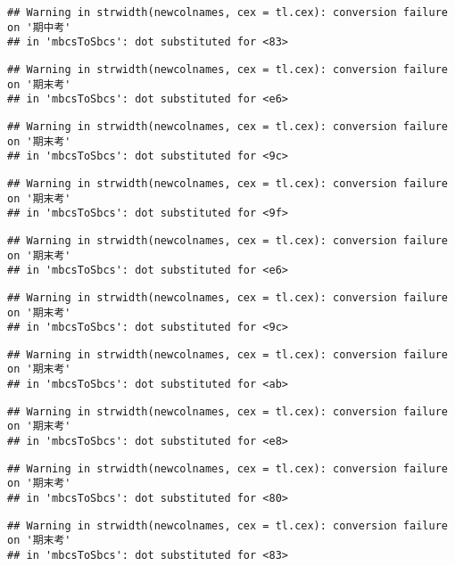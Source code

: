 \documentclass[
]{book}
\begin{document}
\begin{verbatim}
## Warning in strwidth(newcolnames, cex = tl.cex): conversion failure on '期中考'
## in 'mbcsToSbcs': dot substituted for <83>
\end{verbatim}

\begin{verbatim}
## Warning in strwidth(newcolnames, cex = tl.cex): conversion failure on '期末考'
## in 'mbcsToSbcs': dot substituted for <e6>
\end{verbatim}

\begin{verbatim}
## Warning in strwidth(newcolnames, cex = tl.cex): conversion failure on '期末考'
## in 'mbcsToSbcs': dot substituted for <9c>
\end{verbatim}

\begin{verbatim}
## Warning in strwidth(newcolnames, cex = tl.cex): conversion failure on '期末考'
## in 'mbcsToSbcs': dot substituted for <9f>
\end{verbatim}

\begin{verbatim}
## Warning in strwidth(newcolnames, cex = tl.cex): conversion failure on '期末考'
## in 'mbcsToSbcs': dot substituted for <e6>
\end{verbatim}

\begin{verbatim}
## Warning in strwidth(newcolnames, cex = tl.cex): conversion failure on '期末考'
## in 'mbcsToSbcs': dot substituted for <9c>
\end{verbatim}

\begin{verbatim}
## Warning in strwidth(newcolnames, cex = tl.cex): conversion failure on '期末考'
## in 'mbcsToSbcs': dot substituted for <ab>
\end{verbatim}

\begin{verbatim}
## Warning in strwidth(newcolnames, cex = tl.cex): conversion failure on '期末考'
## in 'mbcsToSbcs': dot substituted for <e8>
\end{verbatim}

\begin{verbatim}
## Warning in strwidth(newcolnames, cex = tl.cex): conversion failure on '期末考'
## in 'mbcsToSbcs': dot substituted for <80>
\end{verbatim}

\begin{verbatim}
## Warning in strwidth(newcolnames, cex = tl.cex): conversion failure on '期末考'
## in 'mbcsToSbcs': dot substituted for <83>
\end{verbatim}
\end{document}
